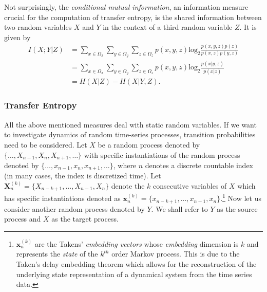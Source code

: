 \documentclass[12pt]{article}
\begin{document}
Not surprisingly, the \textit{conditional mutual information}, an information measure crucial for the computation of transfer entropy, is the shared information between two random variables $X$ and $Y$ in the context of a third random variable $Z$. It is given by
\begin{align*}
I(X;Y | Z) &= \sum_{x \in \Omega_x}^{}\sum_{y \in \Omega_y}^{}\sum_{z \in \Omega_z}^{}p(x,y,z)\text{log}_2\frac{p(x,y,z)p(z)}{p(x,z)p(y,z)} \\
&= \sum_{x \in \Omega_x}^{}\sum_{y \in \Omega_y}^{}\sum_{z \in \Omega_z}^{}p(x,y,z)\text{log}_2\frac{p(x|y,z)}{p(x|z)}\\
&= H(X|Z) - H(X|Y,Z).
\end{align*}
\subsubsection{Transfer Entropy}
All the above mentioned measures deal with static random variables. If we want to investigate dynamics of random time-series processes, transition probabilities need to be considered. Let $X$ be a random process denoted by $\{\dots, X_{n-1}, X_n, X_{n+1}, \dots\}$ with specific instantiations of the random process denoted by $\{\dots, x_{n-1}, x_n, x_{n+1}, \dots\}$, where $n$ denotes a discrete countable index (in many cases, the index is discretized time). Let $\boldsymbol{X}_n^{(k)} = \{X_{n-k+1},\dots,X_{n-1}, X_n\}$ denote the $k$ consecutive variables of $X$ which has specific instantiations denoted as  $\boldsymbol{x}_n^{(k)} = \{x_{n-k+1},\dots,x_{n-1}, x_n\}$.\footnote{$\boldsymbol{x}_n^{(k)}$ are the Takens' \textit{embedding vectors} whose \textit{embedding} dimension is $k$ and represents the \textit{state} of the $k^{th}$ order Markov process. This is due to the Taken's delay embedding theorem which allows for the reconstruction of the underlying state representation of a dynamical system from the time series data.}
Now let us consider another random process denoted by $Y$. We shall refer to $Y$ as the source process and $X$ as the target process.
\end{document}
